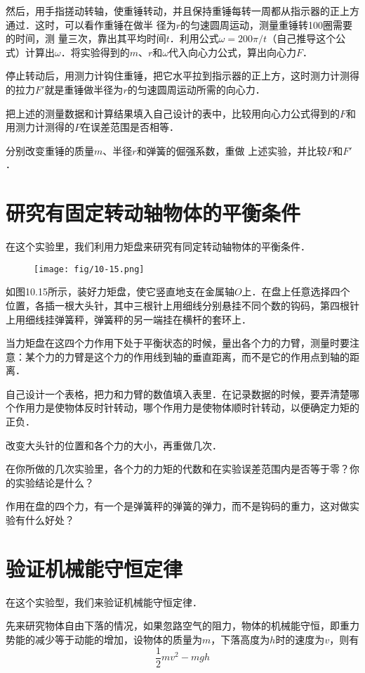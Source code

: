然后，用手指搓动转轴，使重锤转动，并且保持重锤每转一周都从指示器的正上方通过．这时，可以看作重锤在做半
径为$r$的匀速圆周运动，测量重锤转100圈需要的时间，测
量三次，靠出其平均时间$t$．利用公式$\omega=200\pi/t$（自己推导这个公式）计算出$\omega$．将实验得到的$m$、$r$和$\omega$代入向心力公式，算出向心力$F$．

停止转动后，用测力计钩住重锤，把它水平拉到指示器的正上方，这时测力计测得的拉力$F'$就是重锤做半径为$r$的匀速圆周运动所需的向心力．

把上述的测量数据和计算结果填入自己设计的表中，比较用向心力公式得到的$F$和用测力计测得的$P$在误差范围是否相等．

分别改变重锤的质量$m$、半径$r$和弹簧的倔强系数，重做
上述实验，并比较$F$和$F'$．

\section{研究有固定转动轴物体的平衡条件}
在这个实验里，我们利用力矩盘来研究有同定转动轴物体的平衡条件．
\begin{figure}[htp]\centering
    \texttt{[image: fig/10-15.png]}
    \caption{}
    \end{figure}

如图10.15所示，装好力矩盘，使它竖直地支在金属轴$O$上．在盘上任意选择四个位置，各插一根大头针，其中三根针上用细线分别悬挂不同个数的钩码，第四根针上用细线挂弹簧秤，弹簧秤的另一端挂在横杆的套环上．

当力矩盘在这四个力作用下处于平衡状态的时候，量出各个力的力臂，测量时要注意：某个力的力臂是这个力的作用线到轴的垂直距离，而不是它的作用点到轴的距离．

自己设计一个表格，把力和力臂的数值填入表里．在记录数据的时候，要弄清楚哪个作用力是使物体反时针转动，哪个作用力是使物体顺时针转动，以便确定力矩的正负．

改变大头针的位置和各个力的大小，再重做几次．

在你所做的几次实验里，各个力的力矩的代数和在实验误差范围内是否等于零？你的实验结论是什么？

作用在盘的四个力，有一个是弹簧秤的弹簧的弹力，而不是钩码的重力，这对做实验有什么好处？

\section{验证机械能守恒定律}
在这个实验型，我们来验证机械能守恒定律．

先来研究物体自由下落的情况，如果忽路空气的阻力，物体的机械能守恒，即重力势能的减少等于动能的增加，设物体的质量为$m$，下落高度为$h$时的速度为$v$，则有
\[\frac{1}{2}mv^2-mgh\]

